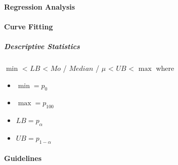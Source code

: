 \documentclass[letterpaper,10pt,english]{jupyterBook}
\begin{document}
\paragraph{Regression Analysis}
\label{\detokenize{PM/jcsrua:regression-analysis}}

\paragraph{Curve Fitting}
\label{\detokenize{PM/jcsrua:curve-fitting}}

\subparagraph{Descriptive Statistics}
\label{\detokenize{PM/jcsrua:id3}}
\sphinxAtStartPar
\(\min\) < \(LB\) < \(Mo\) / \(Median\) / \(\mu\)  < \(UB\) < \(\max\) where
\begin{itemize}
\item {} 
\sphinxAtStartPar
\(\min = p_0\)

\item {} 
\sphinxAtStartPar
\(\max = p_{100}\)

\item {} 
\sphinxAtStartPar
\(LB = p_\alpha\)

\item {} 
\sphinxAtStartPar
\(UB = p_{1-\alpha}\)

\end{itemize}


\paragraph{Guidelines}
\label{\detokenize{PM/jcsrua:guidelines}}
\end{document}
